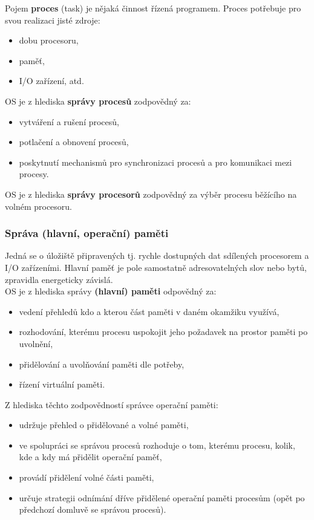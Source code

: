 Pojem \textbf{proces} (task) je nějaká činnost řízená programem. Proces potřebuje pro svou realizaci jisté zdroje:
\begin{itemize}
	\item dobu procesoru,
	\item paměť,
	\item I/O zařízení, atd.
\end{itemize}
OS je z hlediska \textbf{správy procesů} zodpovědný za:
\begin{itemize}
	\item vytváření a rušení procesů,
	\item potlačení a obnovení procesů,
	\item poskytnutí mechanismů pro synchronizaci procesů a pro komunikaci mezi procesy.
\end{itemize}
OS je z hlediska \textbf{správy procesorů} zodpovědný za výběr procesu běžícího na volném procesoru.

\subsubsection{Správa (hlavní, operační) paměti}
Jedná se o úložiště připravených tj. rychle dostupných dat sdílených procesorem a I/O zařízeními. Hlavní paměť je pole samostatně adresovatelných slov nebo bytů, zpravidla energeticky závislá.\\
OS je z hlediska správy \textbf{(hlavní) paměti} odpovědný za:
\begin{itemize}
	\item vedení přehledů kdo a kterou část paměti v daném okamžiku využívá,
	\item rozhodování, kterému procesu uspokojit jeho požadavek na prostor paměti po uvolnění,
	\item přidělování a uvolňování paměti dle potřeby,
	\item řízení virtuální paměti.
\end{itemize}
Z hlediska těchto zodpovědností správce operační paměti:
\begin{itemize}
	\item udržuje přehled o přidělované a volné paměti,
	\item ve spolupráci se správou procesů rozhoduje o tom, kterému procesu, kolik, kde a kdy má přidělit operační paměť,
	\item provádí přidělení volné části paměti,
	\item určuje strategii odnímání dříve přidělené operační paměti procesům (opět po předchozí domluvě se správou procesů).
\end{itemize}

